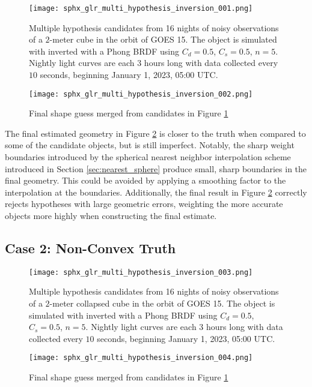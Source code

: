 \begin{figure}[!htb]
    \centering
    \texttt{[image: sphx\_glr\_multi\_hypothesis\_inversion\_001.png]}
    \caption{Multiple hypothesis candidates from 16 nights of noisy observations of a $2$-meter cube in the orbit of GOES 15. The object is simulated with inverted with a Phong BRDF using $C_d=0.5$, $C_s=0.5$, $n=5$. Nightly light curves are each $3$ hours long with data collected every $10$ seconds, beginning January 1, 2023, 05:00 UTC.}
    \label{fig:multi_hyp_candidates_cvx}
\end{figure}

\begin{figure}[!htb]
  \centering
  \texttt{[image: sphx\_glr\_multi\_hypothesis\_inversion\_002.png]}
  \caption{Final shape guess merged from candidates in Figure \ref{fig:multi_hyp_candidates_cvx}}
  \label{fig:multi_hyp_final_cvx}
\end{figure}

The final estimated geometry in Figure \ref{fig:multi_hyp_final_cvx} is closer to the truth when compared to some of the candidate objects, but is still imperfect. Notably, the sharp weight boundaries introduced by the spherical nearest neighbor interpolation scheme introduced in Section \ref{sec:nearest_sphere} produce small, sharp boundaries in the final geometry. This could be avoided by applying a smoothing factor to the interpolation at the boundaries. Additionally, the final result in Figure \ref{fig:multi_hyp_final_cvx} correctly rejects hypotheses with large geometric errors, weighting the more accurate objects more highly when constructing the final estimate.

\subsection{Case 2: Non-Convex Truth}

\begin{figure}[!htb]
  \centering
  \texttt{[image: sphx\_glr\_multi\_hypothesis\_inversion\_003.png]}
  \caption{Multiple hypothesis candidates from 16 nights of noisy observations of a $2$-meter collapsed cube in the orbit of GOES 15. The object is simulated with inverted with a Phong BRDF using $C_d=0.5$, $C_s=0.5$, $n=5$. Nightly light curves are each $3$ hours long with data collected every $10$ seconds, beginning January 1, 2023, 05:00 UTC.}
  \label{fig:multi_hyp_candidates_ncvx}
\end{figure}

\begin{figure}[!htb]
\centering
\texttt{[image: sphx\_glr\_multi\_hypothesis\_inversion\_004.png]}
\caption{Final shape guess merged from candidates in Figure \ref{fig:multi_hyp_candidates_cvx}}
\label{fig:multi_hyp_final_ncvx}
\end{figure}

